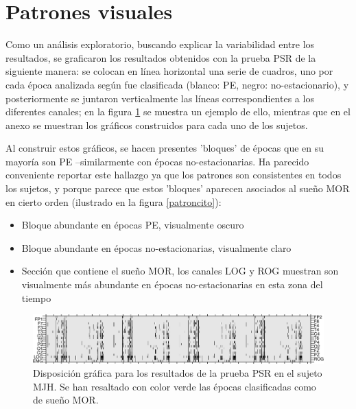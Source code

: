 

\section{Patrones visuales}

Como un análisis exploratorio, buscando explicar la variabilidad entre los resultados, se 
graficaron los resultados obtenidos con la prueba PSR de la siguiente manera: se colocan en 
línea horizontal una serie de cuadros, uno por cada época analizada según fue clasificada 
(blanco: PE, negro: no-estacionario), y posteriormente se juntaron verticalmente las líneas
correspondientes a los diferentes canales; en la figura \ref{ejemplo_graf} se muestra un ejemplo de
ello, mientras que en el anexo se muestran los gráficos construidos para cada uno de los sujetos. 

Al construir estos gráficos, se hacen presentes 'bloques' de épocas que en su mayoría son
PE --similarmente con épocas no-estacionarias. Ha parecido conveniente reportar este hallazgo
ya que los patrones son consistentes en todos los sujetos, y porque parece que estos 'bloques'
aparecen asociados al sueño MOR en cierto orden (ilustrado en la figura \ref{patroncito}):
\begin{itemize}
\item Bloque abundante en épocas PE, visualmente oscuro
\item Bloque abundante en épocas no-estacionarias, visualmente claro
\item Sección que contiene el sueño MOR, los canales LOG y ROG muestran son visualmente más
abundante en épocas no-estacionarias en esta zona del tiempo
\end{itemize}

\begin{figure}
\includegraphics[width=\textwidth]
{./img_ejemplos/MJNNVIGILOS_est.png}
\caption{Disposición gráfica para los resultados de la prueba PSR en el sujeto MJH. Se han 
resaltado con color verde las épocas clasificadas como de sueño MOR.}
\label{ejemplo_graf}
\end{figure}

